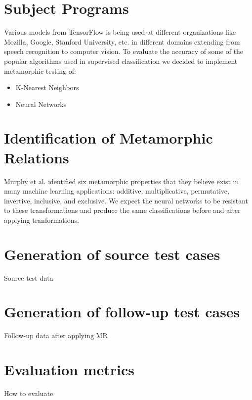 \section{Subject Programs}
Various models from TensorFlow is being used at different organizations like Mozilla, Google, Stanford University, etc. in different domains extending from speech recognition to computer vision. To evaluate the accuracy of some of the popular algorithms used in supervised classification we decided to implement metamorphic testing of:
\begin{itemize}
\item K-Nearest Neighbors
\item Neural Networks
\end{itemize}

\section{Identification of Metamorphic Relations} \label{MRused}
Murphy et al. \cite{Murphy} identified six metamorphic properties that they believe exist in many machine learning applications: additive, multiplicative, permutative, invertive, inclusive, and exclusive. We expect the neural networks to be resistant to these transformations and produce the same classifications before and after applying tranformations.

\section{Generation of source test cases}
Source test data

\section{Generation of follow-up test cases}
Follow-up data after applying MR

\section{Evaluation metrics}
How to evaluate
